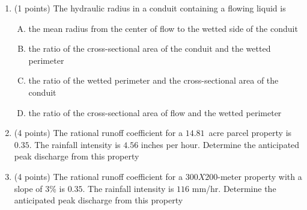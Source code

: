 \documentclass[12pt]{article}
\begin{document}
\begin{enumerate}
\clearpage

\item (1 points) The hydraulic radius in a conduit containing a flowing liquid is
\begin{enumerate} [(A)]
\item	the mean radius from the center of flow to the wetted side of the conduit
\item	the ratio of the cross-sectional area of the conduit and the wetted perimeter
\item	the ratio of the wetted perimeter and the cross-sectional area of the conduit
\item	the ratio of the cross-sectional area of flow and the wetted perimeter
\end{enumerate}
\item (4 points) The rational runoff coefficient for a $14.81$~acre parcel property is $0.35$.  
The rainfall intensity is $4.56$ inches per hour.  
Determine the anticipated peak discharge from this property


\item (4 points) The rational runoff coefficient for a $300X200$-meter property with a slope of $3$\% is $0.35$.  The rainfall intensity is $116$ mm/hr.  Determine the anticipated peak discharge from this property


\end{enumerate}
\end{document}
